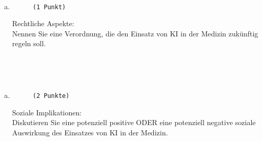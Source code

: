 \documentclass[12pt, ngerman]{AssignmentClass}
\begin{document}
    \begin{answerbox}
		\noindent
		\fbox{\parbox[c]{\textwidth}{
				\vspace{5cm}
				\hspace{\textwidth}
		}}\\
	\end{answerbox}

    \begin{enumerate}[b)]
		\item 
			\begin{minipage}[t]{\linewidth}
				\vspace{-0.61em}
				\begin{figure} 
					\raggedleft
					\texttt{(1 Punkt)}
				\end{figure}
                Rechtliche Aspekte:\\
                Nennen Sie eine Verordnung, die den Einsatz von KI in der Medizin zukünftig regeln soll.
			\end{minipage}
	\end{enumerate}
 
	\begin{solution}
		\noindent
		\\
	\end{solution}

    \begin{answerbox}
		\noindent
		\fbox{\parbox[c]{\textwidth}{
				\vspace{2cm}
				\hspace{\textwidth}
		}}\\
	\end{answerbox}

    \begin{enumerate}[c)]
		\item 
			\begin{minipage}[t]{\linewidth}
				\vspace{-0.61em}
				\begin{figure} 
					\raggedleft
					\texttt{(2 Punkte)}
				\end{figure}
                Soziale Implikationen:\\
                Diskutieren Sie eine potenziell positive ODER eine potenziell negative soziale Auswirkung des Einsatzes von KI in der Medizin.
			\end{minipage}
	\end{enumerate}
 
\end{document}
